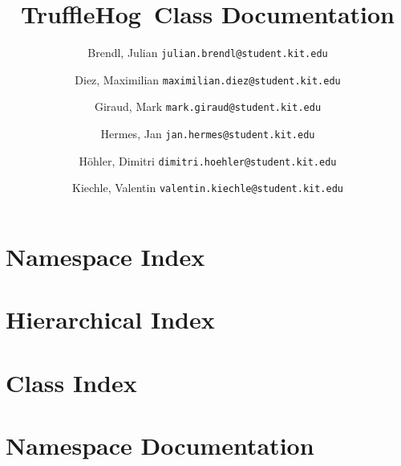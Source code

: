 \documentclass[listof=totoc,a4paper,titlepage]{scrreprt}
\newcommand{\+}{\discretionary{\mbox{\scriptsize$\hookleftarrow$}}{}{}}
\newcommand{\programname}{TruffleHog}
\newcommand{\clearemptydoublepage}{%
  \newpage{\pagestyle{empty}\cleardoublepage}%
}
\begin{document}
\hypersetup{pageanchor=false,
             bookmarks=true,
             bookmarksnumbered=true,
             pdfencoding=unicode
            }

\begin{titlepage}
\title{\programname \ Class Documentation}
\author{
    Brendl, Julian
    \texttt{julian.brendl@student.kit.edu}
    \and
    Diez, Maximilian
    \texttt{maximilian.diez@student.kit.edu}
    \and
    Giraud, Mark
    \texttt{mark.giraud@student.kit.edu}
    \and
    Hermes, Jan
    \texttt{jan.hermes@student.kit.edu}
    \and
    Höhler, Dimitri
    \texttt{dimitri.hoehler@student.kit.edu}
    \and
    Kiechle, Valentin
    \texttt{valentin.kiechle@student.kit.edu}
}

\titlehead{\texttt{[image: images/title.png]}}

\maketitle

\setcounter{page}{2}
\end{titlepage}

\tableofcontents
\clearemptydoublepage
{}
\hypersetup{pageanchor=true}

\chapter{Namespace Index}

\chapter{Hierarchical Index}

\chapter{Class Index}

\chapter{Namespace Documentation}







\end{document}
